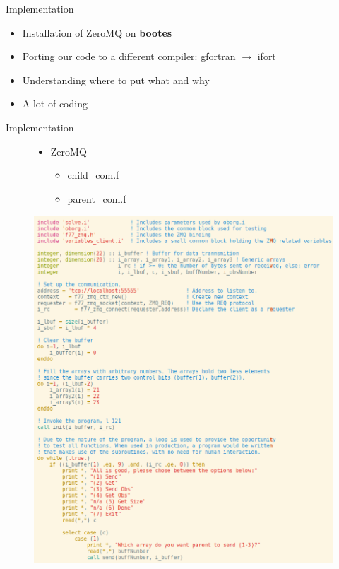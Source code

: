\documentclass{beamer}
\begin{document}
    \begin{frame}{Implementation}
    \begin{itemize}[<+-|alert@+>]
        \item Installation of ZeroMQ on \bf{bootes}
        \item Porting our code to a different compiler: gfortran $\rightarrow$ ifort
        \item Understanding where to put what and why
        \item A lot of coding
    \end{itemize}
    \end{frame}
    \begin{frame}{Implementation}
        \begin{figure}[h!]
        \centering
        \begin{minipage}{.5\columnwidth}
            \begin{itemize}
                \item ZeroMQ
                \pause
                \begin{itemize}[<+-|alert@+>]
                    \item child\_com.f
                    \item parent\_com.f
                \end{itemize}
            \end{itemize}
        \end{minipage}%
        \begin{minipage}{.5\columnwidth}
            \centering
            \includegraphics[width=1\columnwidth]{child_com}
        \end{minipage}
        \end{figure}
    \end{frame}
\end{document}
